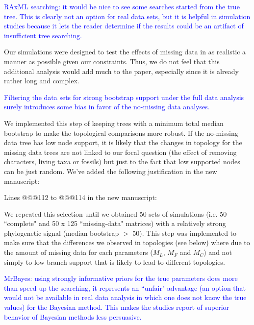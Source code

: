 \documentclass[11pt]{letter}
\begin{document}
\begin{letter}{}
\textcolor{blue}{RAxML searching: it would be nice to see some searches started from the true tree. This is clearly not an option for real data sets, but it is helpful in simulation studies because it lets the reader determine if the results could be an artifact of insufficient tree searching.}

Our simulations were designed to test the effects of missing data in as realistic a manner as possible given our constraints. Thus, we do not feel that this additional analysis would add much to the paper, especially since it is already rather long and complex. 


\textcolor{blue}{Filtering the data sets for strong bootstrap support under the full data analysis surely introduces some bias in favor of the no-missing data analyses.}

We implemented this step of keeping trees with a minimum total median bootstrap to make the topological comparisons more robust. If the no-missing data tree has low node support, it is likely that the changes in topology for the missing data trees are not linked to our focal question (the effect of removing characters, living taxa or fossils) but just to the fact that low supported nodes can be just random. We've added the following justification in the new manuscript:


Lines @@@112 to @@@114 in the new manuscript:

\hfill\begin{minipage}{\dimexpr\textwidth-1cm}
We repeated this selection until we obtained 50 sets of simulations (i.e. 50 ``complete" and 50 x 125 ``missing-data" matrices) with a relatively strong phylogenetic signal (median bootstrap $>$ 50). This step was implemented to make sure that the differences we observed in topologies (see below) where due to the amount of missing data for each parameters ($M_L$, $M_F$ and $M_C$) and not simply to low branch support that is likely to lead to different topologies.
\end{minipage}


\textcolor{blue}{MrBayes: using strongly informative priors for the true parameters does more than speed up the searching, it represents an ``unfair" advantage (an option that would not be available in real data analysis in which one does not know the true values) for the Bayesian method. This makes the studies report of superior behavior of Bayesian methods less persuasive.}


\end{letter}
\end{document}
